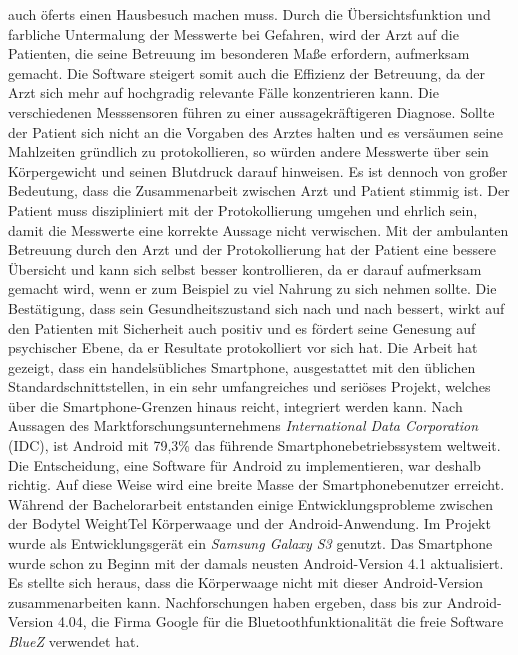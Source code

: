auch \"oferts einen Hausbesuch machen muss.
Durch die \"Ubersichtsfunktion und farbliche Untermalung der Messwerte bei Gefahren, 
wird der Arzt auf die Patienten, die seine Betreuung im besonderen Ma\ss{}e erfordern, aufmerksam gemacht.
Die Software steigert somit auch die Effizienz der Betreuung, da der Arzt sich mehr auf hochgradig 
relevante F\"alle konzentrieren kann.
Die verschiedenen Messsensoren f\"uhren zu einer aussagekr\"aftigeren Diagnose.
Sollte der Patient sich nicht an die Vorgaben des Arztes halten und es vers\"aumen seine Mahlzeiten 
gr\"undlich zu protokollieren, so w\"urden andere Messwerte \"uber sein K\"orpergewicht und seinen Blutdruck 
darauf hinweisen.
Es ist dennoch von gro\ss{}er Bedeutung, dass die Zusammenarbeit zwischen Arzt und Patient stimmig ist.
Der Patient muss diszipliniert mit der Protokollierung umgehen und ehrlich sein,
damit die Messwerte eine korrekte Aussage nicht verwischen.
Mit der ambulanten Betreuung durch den Arzt und der Protokollierung hat der Patient eine bessere 
\"Ubersicht und kann sich selbst besser kontrollieren, da er darauf aufmerksam gemacht wird, 
wenn er zum Beispiel zu viel Nahrung zu sich nehmen sollte.
Die Best\"atigung, dass sein Gesundheitszustand sich nach und nach bessert, wirkt auf den Patienten mit 
Sicherheit auch positiv und es f\"ordert seine Genesung auf psychischer Ebene, 
da er Resultate protokolliert vor sich hat.
Die Arbeit hat gezeigt, dass ein handels\"ubliches Smartphone, ausgestattet mit den \"ublichen 
Standardschnittstellen, in ein sehr umfangreiches und seri\"oses Projekt, 
welches \"uber die Smartphone-Grenzen hinaus reicht, integriert werden kann.
Nach Aussagen des Marktforschungsunternehmens \emph{International Data Corporation} (IDC)\cite{AndroidAnteile:01},
ist Android mit 79,3\% das f\"uhrende Smartphonebetriebssystem weltweit. 
Die Entscheidung, eine Software f\"ur Android zu implementieren, war deshalb richtig.
Auf diese Weise wird eine breite Masse der Smartphonebenutzer erreicht.
W\"ahrend der Bachelorarbeit entstanden einige Entwicklungsprobleme zwischen der Bodytel WeightTel 
K\"orperwaage und der Android-Anwendung.
Im Projekt wurde als Entwicklungsger\"at ein \emph{Samsung Galaxy S3} genutzt.
Das Smartphone wurde schon zu Beginn mit der damals neusten Android-Version 4.1 aktualisiert.
Es stellte sich heraus, dass die K\"orperwaage nicht mit dieser Android-Version zusammenarbeiten kann.
Nachforschungen haben ergeben, dass bis zur Android-Version 4.04, die Firma Google f\"ur die Bluetoothfunktionalit\"at
die freie Software \emph{BlueZ} \cite{BlueZ:01} verwendet hat.
